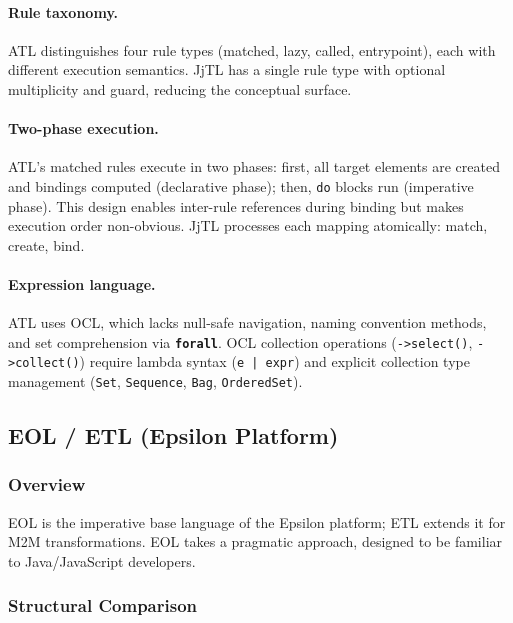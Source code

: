 \documentclass[11pt,a4paper]{article}
\newcommand{\jjtl}{\textsf{JjTL}}
\newcommand{\kw}[1]{\texttt{\textbf{#1}}}
\begin{document}
\paragraph{Rule taxonomy.} ATL distinguishes four rule types (matched, lazy, called, entrypoint), each with different execution semantics. \jjtl{} has a single rule type with optional multiplicity and guard, reducing the conceptual surface.

\paragraph{Two-phase execution.} ATL's matched rules execute in two phases: first, all target elements are created and bindings computed (declarative phase); then, \texttt{do} blocks run (imperative phase). This design enables inter-rule references during binding but makes execution order non-obvious. \jjtl{} processes each mapping atomically: match, create, bind.

\paragraph{Expression language.} ATL uses OCL, which lacks null-safe navigation, naming convention methods, and set comprehension via \kw{forall}. OCL collection operations (\texttt{->select()}, \texttt{->collect()}) require lambda syntax (\texttt{e | expr}) and explicit collection type management (\texttt{Set}, \texttt{Sequence}, \texttt{Bag}, \texttt{OrderedSet}).


\subsection{EOL / ETL (Epsilon Platform)}

\subsubsection{Overview}

EOL is the imperative base language of the Epsilon platform; ETL extends it for M2M transformations. EOL takes a pragmatic approach, designed to be familiar to Java/JavaScript developers.

\subsubsection{Structural Comparison}
\end{document}
